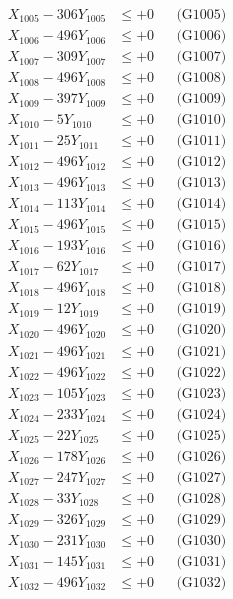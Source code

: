 \documentclass[a4paper,10pt]{article}
\begin{document}
{\begin{align}
X_{1005} - 306Y_{1005} &\leq +0 && \text{(G1005)} \\
X_{1006} - 496Y_{1006} &\leq +0 && \text{(G1006)} \\
X_{1007} - 309Y_{1007} &\leq +0 && \text{(G1007)} \\
X_{1008} - 496Y_{1008} &\leq +0 && \text{(G1008)} \\
X_{1009} - 397Y_{1009} &\leq +0 && \text{(G1009)} \\
X_{1010} - 5Y_{1010} &\leq +0 && \text{(G1010)} \\
\allowbreak
X_{1011} - 25Y_{1011} &\leq +0 && \text{(G1011)} \\
X_{1012} - 496Y_{1012} &\leq +0 && \text{(G1012)} \\
X_{1013} - 496Y_{1013} &\leq +0 && \text{(G1013)} \\
X_{1014} - 113Y_{1014} &\leq +0 && \text{(G1014)} \\
X_{1015} - 496Y_{1015} &\leq +0 && \text{(G1015)} \\
X_{1016} - 193Y_{1016} &\leq +0 && \text{(G1016)} \\
X_{1017} - 62Y_{1017} &\leq +0 && \text{(G1017)} \\
X_{1018} - 496Y_{1018} &\leq +0 && \text{(G1018)} \\
X_{1019} - 12Y_{1019} &\leq +0 && \text{(G1019)} \\
X_{1020} - 496Y_{1020} &\leq +0 && \text{(G1020)} \\
\allowbreak
X_{1021} - 496Y_{1021} &\leq +0 && \text{(G1021)} \\
X_{1022} - 496Y_{1022} &\leq +0 && \text{(G1022)} \\
X_{1023} - 105Y_{1023} &\leq +0 && \text{(G1023)} \\
X_{1024} - 233Y_{1024} &\leq +0 && \text{(G1024)} \\
X_{1025} - 22Y_{1025} &\leq +0 && \text{(G1025)} \\
X_{1026} - 178Y_{1026} &\leq +0 && \text{(G1026)} \\
X_{1027} - 247Y_{1027} &\leq +0 && \text{(G1027)} \\
X_{1028} - 33Y_{1028} &\leq +0 && \text{(G1028)} \\
X_{1029} - 326Y_{1029} &\leq +0 && \text{(G1029)} \\
X_{1030} - 231Y_{1030} &\leq +0 && \text{(G1030)} \\
\allowbreak
X_{1031} - 145Y_{1031} &\leq +0 && \text{(G1031)} \\
X_{1032} - 496Y_{1032} &\leq +0 && \text{(G1032)} \\

\end{align}}
\end{document}

